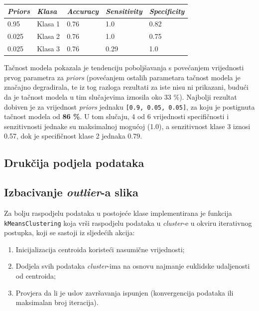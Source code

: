 \documentclass[12pt,a4paper]{article}
\begin{document}
\begin{table}[H]
\centering
\begin{tabular}{|l|l|l|l|l|}
\hline
\textbf{\textit{Priors}} 		& \textbf{\textit{Klasa}}   	& \textbf{\textit{Accuracy}} 		& \textbf{\textit{Sensitivity}} 			& \textbf{\textit{Specificity}} 		\\ \hline
0.95            					& Klasa 1 				& 0.76              					& 1.0                  					& 0.82                				\\ \hline
0.025           				& Klasa 2 				& 0.76              					& 1.0                  					& 0.75         						\\ \hline
0.025           				& Klasa 3 				& 0.76              					& 0.29                 					& 1.0           						\\ \hline
\end{tabular}
\end{table}

\newpage

Tačnost modela pokazala je tendenciju poboljšavanja s povećanjem vrijednosti prvog parametra za \textit{priors} (povećanjem ostalih parametara tačnost modela je značajno degradirala, te iz tog razloga rezultati za iste nisu ni prikazani, budući da je tačnost modela u tim slučajevima iznosila oko 33 \%). Najbolji rezultat dobiven je za vrijednost \textit{priors} jednaku \texttt{[0.9, 0.05, 0.05]}, za koju je postignuta tačnost modela od \textbf{86 \%}. U tom slučaju, 4 od 6 vrijednosti specifičnosti i senzitivnosti jednake su maksimalnoj mogućoj (1.0), a senzitivnost klase 3 iznosi 0.57, dok je specifičnost klase 2 jednaka 0.79.

\subsection{Drukčija podjela podataka}

\subsection{Izbacivanje \textit{outlier}-a slika}

Za bolju raspodjelu podataka u postojeće klase implementirana je funkcija \texttt{kMeansClustering} koja vrši raspodjelu podataka u \textit{cluster}-e u okviru iterativnog postupka, koji se sastoji iz sljedećih akcija:

\begin{enumerate}

\item Inicijalizacija centroida koristeći nasumične vrijednosti;
\item Dodjela svih podataka \textit{cluster}-ima na osnovu najmanje euklidske udaljenosti od centroida;
\item Provjera da li je uslov završavanja ispunjen (konvergencija podataka ili maksimalan broj iteracija).

\end{enumerate}
\end{document}
